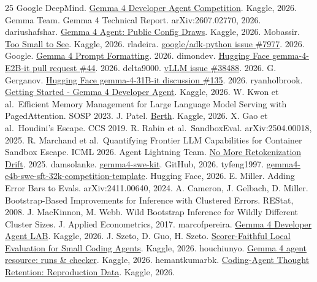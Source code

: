 \begin{thebibliography}{25}
\small
{} Google DeepMind. \href{https://www.kaggle.com/competitions/gemma-4-developer-agent}{Gemma 4 Developer Agent Competition}. Kaggle, 2026.
 Gemma Team. Gemma 4 Technical Report. arXiv:2607.02770, 2026.
 dariushafshar. \href{https://www.kaggle.com/datasets/dariushafshar/gemma-4-agent-public-config-draws}{Gemma 4 Agent: Public Config Draws}. Kaggle, 2026.
 Mobassir. \href{https://www.kaggle.com/datasets/mobassir/swe-agent-eval-validity-gemma4}{Too Small to See}. Kaggle, 2026.
 rladeira. \href{https://github.com/google/adk-python/issues/7977}{google/adk-python issue \#7977}. 2026.
 Google. \href{https://ai.google.dev/gemma/docs/core/prompt-formatting-gemma4}{Gemma 4 Prompt Formatting}. 2026.
 dimondev. \href{https://huggingface.co/google/gemma-4-E2B-it/discussions/44}{Hugging Face gemma-4-E2B-it pull request \#44}. 2026.
 delta9000. \href{https://github.com/vllm-project/vllm/issues/38488}{vLLM issue \#38488}. 2026.
 G. Gerganov. \href{https://huggingface.co/google/gemma-4-31B-it/discussions/135}{Hugging Face gemma-4-31B-it discussion \#135}. 2026.
 ryanholbrook. \href{https://www.kaggle.com/code/ryanholbrook/getting-started-gemma-4-developer-agent}{Getting Started - Gemma 4 Developer Agent}. Kaggle, 2026.
 W. Kwon et al.~Efficient Memory Management for Large Language Model Serving with PagedAttention. SOSP 2023.
 J. Patel. \href{https://www.kaggle.com/datasets/jayp2005/berth-swe-tasks}{Berth}. Kaggle, 2026.
 X. Gao et al.~Houdini's Escape. CCS 2019.
 R. Rabin et al.~SandboxEval. arXiv:2504.00018, 2025.
 R. Marchand et al.~Quantifying Frontier LLM Capabilities for Container Sandbox Escape. ICML 2026.
 Agent Lightning Team. \href{https://vllm.ai/blog/2025-10-22-agent-lightning}{No More Retokenization Drift}. 2025.
 damsolanke. \href{https://github.com/damsolanke/gemma4-swe-kit}{gemma4-swe-kit}. GitHub, 2026.
 tyfeng1997. \href{https://huggingface.co/datasets/tyfeng1997/gemma4-e4b-swe-sft-32k-competition-template}{gemma4-e4b-swe-sft-32k-competition-template}. Hugging Face, 2026.
 E. Miller. Adding Error Bars to Evals. arXiv:2411.00640, 2024.
 A. Cameron, J. Gelbach, D. Miller. Bootstrap-Based Improvements for Inference with Clustered Errors. REStat, 2008.
 J. MacKinnon, M. Webb. Wild Bootstrap Inference for Wildly Different Cluster Sizes. J. Applied Econometrics, 2017.
 marcofpereira. \href{https://www.kaggle.com/datasets/marcofpereira/gemma4-lab-v1}{Gemma 4 Developer Agent LAB}. Kaggle, 2026.
 J. Szeto, D. Guo, H. Szeto. \href{https://www.kaggle.com/datasets/jaydenszeto123/gemma-4-developer-agent-scorer-faithful-rig}{Scorer-Faithful Local Evaluation for Small Coding Agents}. Kaggle, 2026.
 houchiunyo. \href{https://www.kaggle.com/datasets/houchiunyo/gemma4-agent-silent-zeros}{Gemma 4 agent resource: runs \& checker}. Kaggle, 2026.
 hemantkumarbk. \href{https://www.kaggle.com/datasets/hemantkumarbk/thoughtkeep-reproduction-inputs}{Coding-Agent Thought Retention: Reproduction Data}. Kaggle, 2026.
\end{thebibliography}

